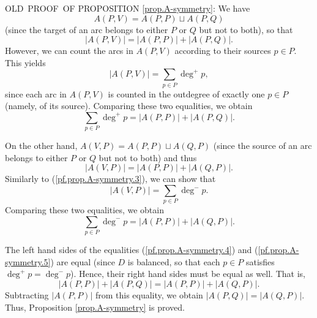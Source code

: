 \documentclass[numbers=enddot,12pt,final,onecolumn,notitlepage]{scrartcl}%
\theoremstyle{definition}
\let\sumnonlimits\sum
\renewcommand{\sum}{\sumnonlimits\limits}
\newenvironment{noncompile}{}{}
\theoremstyle{plainsl}
\begin{document}
\begin{noncompile}
OLD\ PROOF\ OF PROPOSITION \ref{prop.A-symmetry}: We have%
\[
A\left(  P,V\right)  =A\left(  P,P\right)  \sqcup A\left(  P,Q\right)
\]
(since the target of an arc belongs to either $P$ or $Q$ but not to both), so
that%
\[
\left\vert A\left(  P,V\right)  \right\vert =\left\vert A\left(  P,P\right)
\right\vert +\left\vert A\left(  P,Q\right)  \right\vert .
\]
However, we can count the arcs in $A\left(  P,V\right)  $ according to their
sources $p\in P$. This yields%
\begin{equation}
\left\vert A\left(  P,V\right)  \right\vert =\sum_{p\in P}\deg^{+}p,
\label{pf.prop.A-symmetry.3}%
\end{equation}
since each arc in $A\left(  P,V\right)  $ is counted in the outdegree of
exactly one $p\in P$ (namely, of its source). Comparing these two equalities,
we obtain%
\begin{equation}
\sum_{p\in P}\deg^{+}p=\left\vert A\left(  P,P\right)  \right\vert +\left\vert
A\left(  P,Q\right)  \right\vert . \label{pf.prop.A-symmetry.4}%
\end{equation}


On the other hand, $A\left(  V,P\right)  =A\left(  P,P\right)  \sqcup A\left(
Q,P\right)  $ (since the source of an arc belongs to either $P$ or $Q$ but not
to both) and thus%
\[
\left\vert A\left(  V,P\right)  \right\vert =\left\vert A\left(  P,P\right)
\right\vert +\left\vert A\left(  Q,P\right)  \right\vert .
\]
Similarly to (\ref{pf.prop.A-symmetry.3}), we can show that%
\[
\left\vert A\left(  V,P\right)  \right\vert =\sum_{p\in P}\deg^{-}p.
\]
Comparing these two equalities, we obtain%
\begin{equation}
\sum_{p\in P}\deg^{-}p=\left\vert A\left(  P,P\right)  \right\vert +\left\vert
A\left(  Q,P\right)  \right\vert . \label{pf.prop.A-symmetry.5}%
\end{equation}


The left hand sides of the equalities (\ref{pf.prop.A-symmetry.4}) and
(\ref{pf.prop.A-symmetry.5}) are equal (since $D$ is balanced, so that each
$p\in P$ satisfies $\deg^{+}p=\deg^{-}p$). Hence, their right hand sides must
be equal as well. That is,%
\[
\left\vert A\left(  P,P\right)  \right\vert +\left\vert A\left(  P,Q\right)
\right\vert =\left\vert A\left(  P,P\right)  \right\vert +\left\vert A\left(
Q,P\right)  \right\vert .
\]
Subtracting $\left\vert A\left(  P,P\right)  \right\vert $ from this equality,
we obtain $\left\vert A\left(  P,Q\right)  \right\vert =\left\vert A\left(
Q,P\right)  \right\vert $. Thus, Proposition \ref{prop.A-symmetry} is proved.
\end{noncompile}
\end{document}
